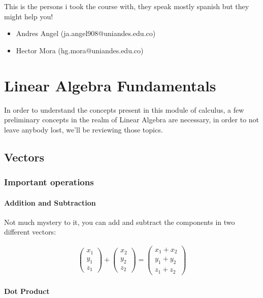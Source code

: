 \documentclass[11pt,fleqn]{book} %
\begin{document}
This is the persons i took the course with, they speak mostly spanish but they might help you!
\begin{itemize}
    \item Andres Angel (ja.angel908@uniandes.edu.co) 
    \item Hector Mora (hg.mora@uniandes.edu.co)   
\end{itemize}

\chapter{Linear Algebra Fundamentals}

In order to understand the concepts present in this module of calculus, a few preliminary concepts
in the realm of Linear Algebra are necessary, in order to not leave anybody lost, we'll be reviewing those topics.

\section{Vectors}
\subsection{Important operations}
\subsubsection{Addition and Subtraction}
Not much mystery to it, you can add and subtract the components in two different vectors:

\begin{gather*}
    \begin{pmatrix}
        x_1 \\ y_1 \\ z_1
    \end{pmatrix}
    +
    \begin{pmatrix}
        x_2 \\ y_2 \\ z_2
    \end{pmatrix} =
    \begin{pmatrix}
        x_1 + x_2 \\ y_1 + y_2 \\ z_1 + z_2
    \end{pmatrix} 
\end{gather*}

\subsubsection{Dot Product}
\end{document}
